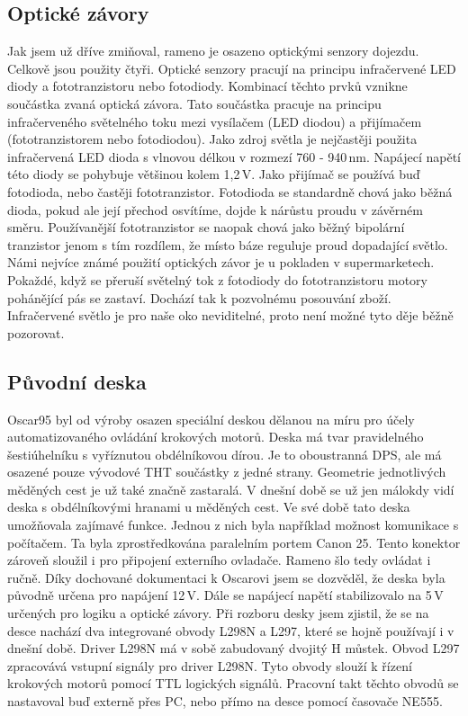 \subsection{Optické závory}
Jak jsem už dříve zmiňoval, rameno je osazeno optickými senzory dojezdu. Celkově jsou 
použity čtyři. Optické senzory pracují na principu infračervené LED diody a fototranzistoru
nebo fotodiody. Kombinací těchto prvků vznikne součástka zvaná optická závora. Tato 
součástka pracuje na principu infračerveného světelného toku mezi vysílačem (LED diodou) a 
přijímačem (fototranzistorem nebo fotodiodou). Jako zdroj světla je nejčastěji použita
infračervená LED dioda s vlnovou délkou v rozmezí 760 - 940\,nm. Napájecí napětí této 
diody se pohybuje většinou kolem 1,2\,V. Jako přijímač se používá buď fotodioda, nebo častěji 
fototranzistor. Fotodioda se standardně chová jako běžná dioda, pokud ale její přechod 
osvítíme, dojde k nárůstu proudu v závěrném směru. Používanější fototranzistor se naopak 
chová jako běžný bipolární tranzistor jenom s tím rozdílem, že místo báze reguluje proud 
dopadající světlo. Námi nejvíce známé použití optických závor je u pokladen v supermarketech. 
Pokaždé, když se přeruší světelný tok z fotodiody do fototranzistoru motory pohánějící pás se 
zastaví. Dochází tak k pozvolnému posouvání zboží. Infračervené světlo je pro naše oko 
neviditelné, proto není možné tyto děje běžně pozorovat. \cite{bibtex:Kratochvíl}
\subsection{Původní deska}
Oscar95 byl od výroby osazen speciální deskou dělanou na míru pro účely 
automatizovaného ovládání krokových motorů. Deska má tvar pravidelného šestiúhelníku 
s vyříznutou obdélníkovou dírou. Je to oboustranná DPS, ale má osazené pouze vývodové THT 
součástky z jedné strany. Geometrie jednotlivých měděných cest je už také značně zastaralá. 
V dnešní době se už jen málokdy vidí deska s obdélníkovými hranami u měděných cest. Ve své 
době tato deska umožňovala zajímavé funkce. Jednou z nich byla například možnost 
komunikace s počítačem. Ta byla zprostředkována paralelním portem Canon 25. Tento 
konektor zároveň sloužil i pro připojení externího ovladače. Rameno šlo tedy ovládat i ručně. 
Díky dochované dokumentaci k Oscarovi jsem se dozvěděl, že deska byla původně určena pro 
napájení 12\,V. Dále se napájecí napětí stabilizovalo na 5\,V určených pro logiku a optické závory. 
Při rozboru desky jsem zjistil, že se na desce nachází dva integrované obvody L298N a L297, 
které se hojně používají i v dnešní době. Driver L298N má v sobě zabudovaný dvojitý H 
můstek. Obvod L297 zpracovává vstupní signály pro driver L298N. Tyto obvody slouží k řízení 
krokových motorů pomocí TTL logických signálů. Pracovní takt těchto obvodů se nastavoval 
buď externě přes PC, nebo přímo na desce pomocí časovače NE555. \cite{Oscar95} \cite{staveb-robot}  


